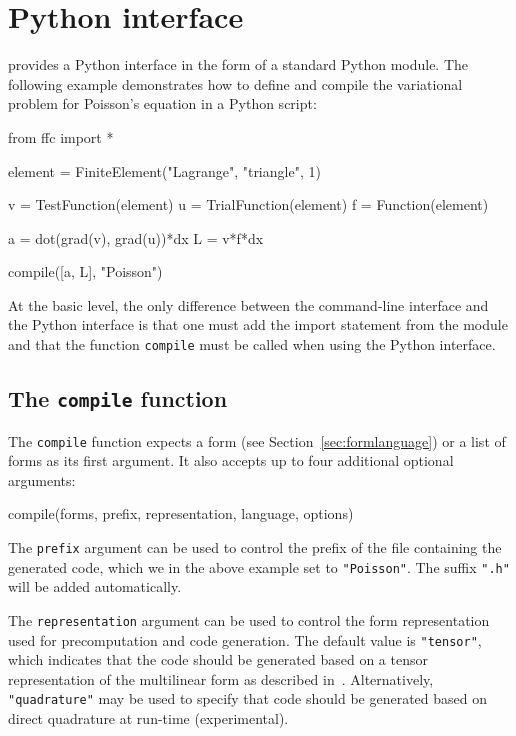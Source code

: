 \chapter{Python interface}

\ffc{} provides a Python interface in the form of a standard
Python module. The following example demonstrates how to define and
compile the variational problem for Poisson's equation in a Python
script:

\begin{code}
from ffc import *

element = FiniteElement("Lagrange", "triangle", 1)

v = TestFunction(element)
u = TrialFunction(element)
f = Function(element)

a = dot(grad(v), grad(u))*dx
L = v*f*dx

compile([a, L], "Poisson")
\end{code}

At the basic level, the only difference between the command-line
interface and the Python interface is that one must add the
import statement from the \ffc{} module and that the function
\texttt{compile} must be called when using the Python interface.

\section{The \texttt{compile} function}

The \texttt{compile} function expects a form (see
Section~\ref{sec:formlanguage}) or a list of forms as its first
argument. It also accepts up to four additional optional arguments:
\begin{code}
compile(forms, prefix, representation, language, options)
\end{code}

The \texttt{prefix} argument can be used to control the prefix of the
file containing the generated code, which we in the above example set
to \texttt{"Poisson"}. The suffix \texttt{".h"} will be added
automatically.

The \texttt{representation} argument can be used to control the form
representation used for precomputation and code generation. The
default value is \texttt{"tensor"}, which indicates that the code
should be generated based on a tensor representation of the
multilinear form as described
in~\cite{KirLog06,KirLog07}. Alternatively, \texttt{"quadrature"} may be
used to specify that code should be generated based on direct
quadrature at run-time (experimental).

